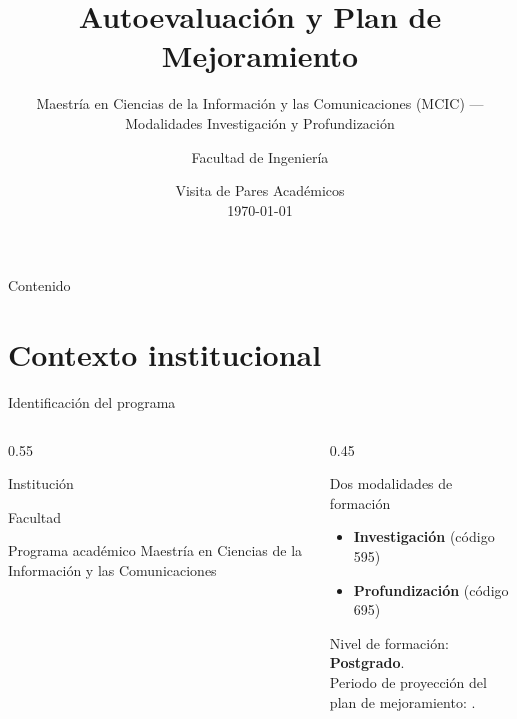 \documentclass[aspectratio=169, 11pt]{beamer}
\title{Autoevaluación y Plan de Mejoramiento}
\subtitle{Maestría en Ciencias de la Información y las Comunicaciones (MCIC) --- Modalidades Investigación y Profundización}
\author{Facultad de Ingeniería}
\institute{\Institucion}
\date{Visita de Pares Académicos \\ \today}
\begin{document}
\pgfplotsset{compat=1.18}

\maketitle

\begin{frame}{Contenido}
  \tableofcontents
\end{frame}

\section{Contexto institucional}

\begin{frame}{Identificación del programa}
  \begin{columns}[T]
    \begin{column}{0.55\textwidth}
      \begin{block}{Institución}
        \Institucion
      \end{block}
      \begin{block}{Facultad}
        \Facultad
      \end{block}
      \begin{block}{Programa académico}
        Maestría en Ciencias de la Información y las Comunicaciones
      \end{block}
    \end{column}
    \begin{column}{0.45\textwidth}
      \begin{alertblock}{Dos modalidades de formación}
        \begin{itemize}
          \item \textbf{Investigación} (código 595)
          \item \textbf{Profundización} (código 695)
        \end{itemize}
        Nivel de formación: \textbf{Postgrado}. \\
        Periodo de proyección del plan de mejoramiento: \textbf{\FechaPlan}.
      \end{alertblock}
    \end{column}
  \end{columns}
\end{frame}
\end{document}
